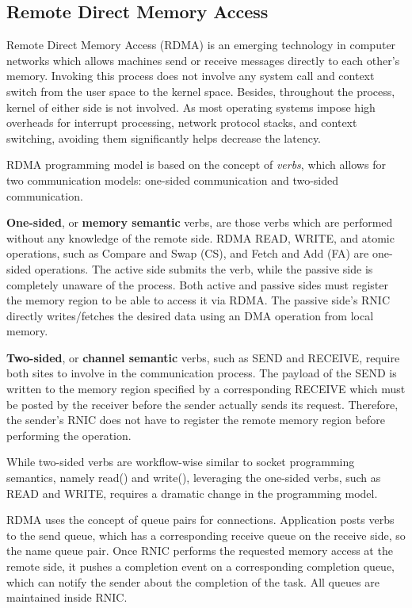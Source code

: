 \documentclass[twoside]{article}
\begin{document}
\begin{multicols}{2}
\section{Remote Direct Memory Access}
\label{background:rdma}
Remote Direct Memory Access (RDMA) is an emerging technology in computer networks which allows machines send or receive messages directly to each other's memory.
Invoking this process does not involve any system call and context switch from the user space to the kernel space.
Besides, throughout the process, kernel of either side is not involved.
As most operating systems impose high overheads for interrupt processing, network protocol stacks, and context switching, avoiding them significantly helps decrease the latency.

RDMA programming model is based on the concept of \emph{verbs}, which allows for two communication models: one-sided communication and two-sided communication.

\textbf{One-sided}, or \textbf{memory semantic} verbs, are those verbs which are performed without any knowledge of the remote side.
RDMA READ, WRITE, and atomic operations, such as Compare and Swap (CS), and Fetch and Add (FA) are one-sided operations.
The active side submits the verb, while the passive side is completely unaware of the process.
Both active and passive sides must register the memory region to be able to access it via RDMA.
The passive side's RNIC directly writes/fetches the desired data using an DMA operation from local memory.

\textbf{Two-sided}, or \textbf{channel semantic} verbs, such as SEND and RECEIVE, require both sites to involve in the communication process.
The payload of the SEND is written to the memory region specified by a corresponding RECEIVE which must be posted by the receiver before the sender actually sends its request.
Therefore, the sender's RNIC does not have to register the remote memory region before performing the operation.

While two-sided verbs are workflow-wise similar to socket programming semantics, namely read() and write(), leveraging the one-sided verbs, such as READ and WRITE, requires a dramatic change in the programming model. 

RDMA uses the concept of queue pairs for connections.
Application posts verbs to the send queue, which has a corresponding receive queue on the receive side, so the name queue pair.
Once RNIC performs the requested memory access at the remote side, it pushes a completion event on a corresponding completion queue, which can notify the sender about the completion of the task.
All queues are maintained inside RNIC.






\end{multicols}
\end{document}

